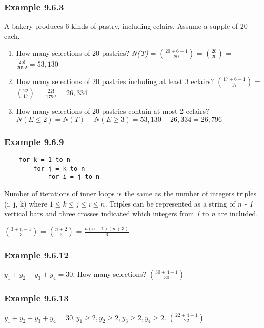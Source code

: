 \documentclass{article}
\begin{document}
\subsubsection*{Example 9.6.3}
A bakery produces 6 kinds of pastry, including eclairs. Assume a supple of 20 each.

\begin{enumerate}
    \item How many selections of 20 pastries? \textit{N(T)} = $20 + 6 - 1 \choose 20$ = $20 \choose 20$ = $\frac{25!}{20!5!} = 53,130$
    \item How many selections of 20 pastries including at least 3 eclairs? $17 + 6 - 1 \choose 17$ = $22 \choose 17$ = $\frac{22!}{17!5!} = 26,334$
    \item How many selections of 20 pastries contain at most 2 eclairs? $N(E \leq 2) = N(T) - N(E \geq 3) = 53,130 - 26,334 = 26,796$
\end{enumerate}

\subsubsection*{Example 9.6.9}
\begin{verbatim}
    for k = 1 to n
        for j = k to n
            for i = j to n
\end{verbatim}

Number of iterations of inner loops is the same as the number of integers triples (i, j, k) where $1 \leq k \leq j \leq i \leq n$. Triples can be represented as a string of \textit{n - 1} vertical bars and three crosses indicated which integers from \textit{1} to \textit{n} are included.

\noindent
$3 + n - 1 \choose 3$ = $n + 2 \choose 3$ = $\frac{n(n + 1)(n + 3)}{6}$


\subsubsection*{Example 9.6.12}
$y_1 + y_2 + y_3 + y_4 = 30$. How many selections? $30 + 4 - 1 \choose 30$

\subsubsection*{Example 9.6.13}
$y_1 + y_2 + y_3 + y_4 = 30, y_1 \geq 2, y_2 \geq 2, y_3 \geq 2, y_4 \geq 2$. $22 + 4 - 1 \choose 22$
\end{document}

